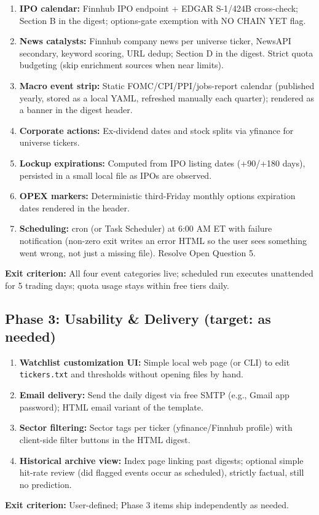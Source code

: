 \documentclass[11pt]{article}
\begin{document}
\begin{enumerate}
  \item \textbf{IPO calendar:} Finnhub IPO endpoint + EDGAR S-1/424B cross-check; Section B in the digest; options-gate exemption with NO CHAIN YET flag.
  \item \textbf{News catalysts:} Finnhub company news per universe ticker, NewsAPI secondary, keyword scoring, URL dedup; Section D in the digest. Strict quota budgeting (skip enrichment sources when near limits).
  \item \textbf{Macro event strip:} Static FOMC/CPI/PPI/jobs-report calendar (published yearly, stored as a local YAML, refreshed manually each quarter); rendered as a banner in the digest header.
  \item \textbf{Corporate actions:} Ex-dividend dates and stock splits via yfinance for universe tickers.
  \item \textbf{Lockup expirations:} Computed from IPO listing dates (+90/+180 days), persisted in a small local file as IPOs are observed.
  \item \textbf{OPEX markers:} Deterministic third-Friday monthly options expiration dates rendered in the header.
  \item \textbf{Scheduling:} cron (or Task Scheduler) at 6:00 AM ET with failure notification (non-zero exit writes an error HTML so the user sees something went wrong, not just a missing file). Resolve Open Question 5.
\end{enumerate}
\textbf{Exit criterion:} All four event categories live; scheduled run executes unattended for 5 trading days; quota usage stays within free tiers daily.

\subsection{Phase 3: Usability \& Delivery \hfill {\small (target: as needed)}}

\begin{enumerate}
  \item \textbf{Watchlist customization UI:} Simple local web page (or CLI) to edit \texttt{tickers.txt} and thresholds without opening files by hand.
  \item \textbf{Email delivery:} Send the daily digest via free SMTP (e.g., Gmail app password); HTML email variant of the template.
  \item \textbf{Sector filtering:} Sector tags per ticker (yfinance/Finnhub profile) with client-side filter buttons in the HTML digest.
  \item \textbf{Historical archive view:} Index page linking past digests; optional simple hit-rate review (did flagged events occur as scheduled), strictly factual, still no prediction.
\end{enumerate}
\textbf{Exit criterion:} User-defined; Phase 3 items ship independently as needed.
\end{document}
